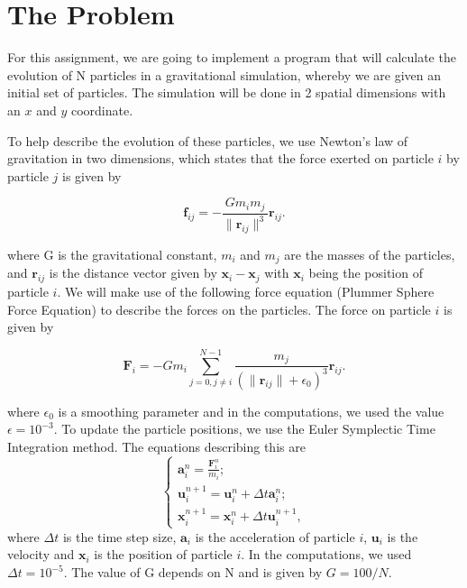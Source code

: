 \section{The Problem}
For this assignment, we are going to implement a program that will calculate the evolution of N particles in a gravitational simulation, whereby we are given an initial set of particles. The simulation will be done in 2 spatial dimensions with an $x$ and $y$ coordinate.

To help describe the evolution of these particles, we use Newton's law of gravitation in two dimensions, which states that the force exerted on particle $i$ by particle $j$ is given by

  $$\boldsymbol{f}_{ij} = -\frac{Gm_{i}m_{j}}{\|\boldsymbol{r}_{ij}\|^{3}}\boldsymbol{r}_{ij}.$$

where G is the gravitational constant, $m_{i}$ and $m_{j}$ are the masses of the particles, and $\boldsymbol{r}_{ij}$ is the distance vector given by $\boldsymbol{x}_{i} -\boldsymbol{x}_{j}$ with $\boldsymbol{x}_{i}$ being the position of particle $i$. We will make use of the following force equation (Plummer Sphere Force Equation) to describe the forces on the particles. The force on particle $i$ is given by

    $$\boldsymbol{F}_{i} = -Gm_{i}\sum_{j = 0, j \neq i}^{N-1}\frac{m_{j}}{(\|\boldsymbol{r}_{ij}\| + \epsilon_{0})^{3}}\boldsymbol{r}_{ij}.$$

where $\epsilon_{0}$ is a smoothing parameter and in the computations, we used the value $\epsilon = 10^{-3}$. To update the particle positions, we use the Euler Symplectic Time Integration method. The equations describing this are
$$
\begin{cases}
    \boldsymbol{a}_{i}^{n} = \frac{\boldsymbol{F}_{i}^{n}}{m_{i}};
    \\
    \boldsymbol{u}_{i}^{n+1} = \boldsymbol{u}_{i}^{n} + \Delta t\boldsymbol{a}_{i}^{n};
    \\
    \boldsymbol{x}_{i}^{n+1} = \boldsymbol{x}_{i}^{n} + \Delta t\boldsymbol{u}_{i}^{n+1},
\end{cases}
$$
where $\Delta t$ is the time step size, $\boldsymbol{a}_{i}$ is the acceleration of particle $i$, $\boldsymbol{u}_{i}$ is the velocity and $\boldsymbol{x}_{i}$ is the position of particle $i$. In the computations, we used $\Delta t = 10^{-5}$. The value of G depends on N and is given by $G = 100/N$.
\newpage
